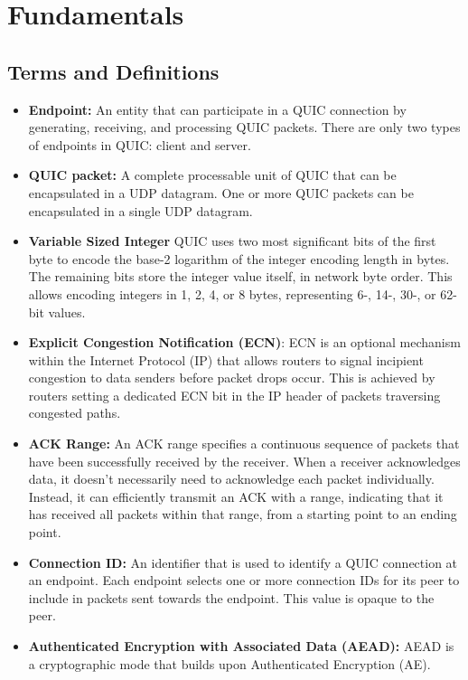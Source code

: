 \chapter{Fundamentals}

\section{Terms and Definitions}

\begin{itemize}
    \item \textbf{Endpoint:} An entity that can participate in a QUIC connection by generating, receiving, and processing QUIC packets. 
    There are only two types of endpoints in QUIC: client and server.
    \item \textbf{QUIC packet:} A complete processable unit of QUIC that can be encapsulated in a UDP datagram. One or more QUIC
    packets can be encapsulated in a single UDP datagram.
    \item \textbf{Variable Sized Integer} QUIC uses two most significant bits of the first byte to encode the base-2 logarithm of the
    integer encoding length in bytes. The remaining bits store the integer value itself, in network byte order. This allows encoding
    integers in 1, 2, 4, or 8 bytes, representing 6-, 14-, 30-, or 62-bit values. \label{variable_sized_integer}
    \item \textbf{Explicit Congestion Notification (ECN)}: ECN is an optional mechanism within the Internet Protocol (IP) that allows
    routers to signal incipient congestion to data senders before packet drops occur. This is achieved by routers setting a dedicated ECN
    bit in the IP header of packets traversing congested paths. \label{ecn}
    \item \textbf{ACK Range:} An ACK range specifies a continuous sequence of packets that have been successfully received by the receiver. When a
    receiver acknowledges data, it doesn't necessarily need to acknowledge each packet individually. Instead, it can efficiently transmit an ACK
    with a range, indicating that it has received all packets within that range, from a starting point to an ending point. \label{ack_range}
    \item \textbf{Connection ID:} An identifier that is used to identify a QUIC connection at an endpoint. Each endpoint selects one
    or more connection IDs for its peer to include in packets sent towards the endpoint. This value is opaque to the peer. \label{cid}
    \item \textbf{Authenticated Encryption with Associated Data (AEAD):} AEAD is a cryptographic mode that builds upon Authenticated Encryption (AE).

\end{itemize}
